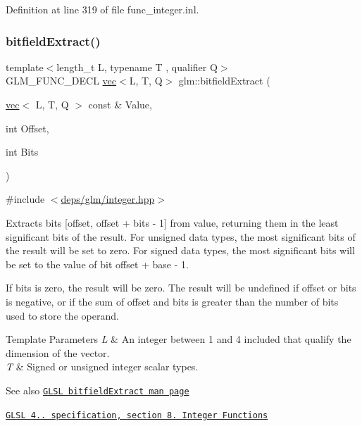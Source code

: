 Definition at line 319 of file func\+\_\+integer.\+inl.

\mbox{\label{group__core__func__integer_ga346b25ab11e793e91a4a69c8aa6819f2}} 
\subsubsection{\texorpdfstring{bitfield\+Extract()}{bitfieldExtract()}}
{\footnotesize\ttfamily template$<$length\+\_\+t L, typename T , qualifier Q$>$ \\
G\+L\+M\+\_\+\+F\+U\+N\+C\+\_\+\+D\+E\+CL \hyperlink{structglm_1_1vec}{vec}$<$L, T, Q$>$ glm\+::bitfield\+Extract (\begin{DoxyParamCaption}\item[{\hyperlink{structglm_1_1vec}{vec}$<$ L, T, Q $>$ const \&}]{Value,  }\item[{int}]{Offset,  }\item[{int}]{Bits }\end{DoxyParamCaption})}



{\ttfamily \#include $<$\hyperlink{integer_8hpp}{deps/glm/integer.\+hpp}$>$}

Extracts bits \mbox{[}offset, offset + bits -\/ 1\mbox{]} from value, returning them in the least significant bits of the result. For unsigned data types, the most significant bits of the result will be set to zero. For signed data types, the most significant bits will be set to the value of bit offset + base -\/ 1.

If bits is zero, the result will be zero. The result will be undefined if offset or bits is negative, or if the sum of offset and bits is greater than the number of bits used to store the operand.


\begin{DoxyTemplParams}{Template Parameters}
{\em L} & An integer between 1 and 4 included that qualify the dimension of the vector. \\
\hline
{\em T} & Signed or unsigned integer scalar types.\\
\hline
\end{DoxyTemplParams}
\begin{DoxySeeAlso}{See also}
\href{http://www.opengl.org/sdk/docs/manglsl/xhtml/bitfieldExtract.xml}{\tt G\+L\+SL bitfield\+Extract man page} 

\href{http://www.opengl.org/registry/doc/GLSLangSpec.4.20.8.pdf}{\tt G\+L\+SL 4.. specification, section 8. Integer Functions} 
\end{DoxySeeAlso}


